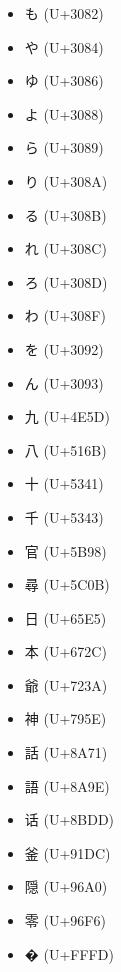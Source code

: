 \documentclass[a4paper]{article}
\begin{document}
\begin{itemize}
    \item {\babelstone も } (U+3082)
    \item {\babelstone や } (U+3084)
    \item {\babelstone ゆ } (U+3086)
    \item {\babelstone よ } (U+3088)
    \item {\babelstone ら } (U+3089)
    \item {\babelstone り } (U+308A)
    \item {\babelstone る } (U+308B)
    \item {\babelstone れ } (U+308C)
    \item {\babelstone ろ } (U+308D)
    \item {\babelstone わ } (U+308F)
    \item {\babelstone を } (U+3092)
    \item {\babelstone ん } (U+3093)
    \item {\babelstone 九 } (U+4E5D)
    \item {\babelstone 八 } (U+516B)
    \item {\babelstone 十 } (U+5341)
    \item {\babelstone 千 } (U+5343)
    \item {\babelstone 官 } (U+5B98)
    \item {\babelstone 尋 } (U+5C0B)
    \item {\babelstone 日 } (U+65E5)
    \item {\babelstone 本 } (U+672C)
    \item {\babelstone 爺 } (U+723A)
    \item {\babelstone 神 } (U+795E)
    \item {\babelstone 話 } (U+8A71)
    \item {\babelstone 語 } (U+8A9E)
    \item {\babelstone 话 } (U+8BDD)
    \item {\babelstone 釜 } (U+91DC)
    \item {\babelstone 隠 } (U+96A0)
    \item {\babelstone 零 } (U+96F6)
    \item {\babelstone � } (U+FFFD)

\end{itemize}
\end{document}

